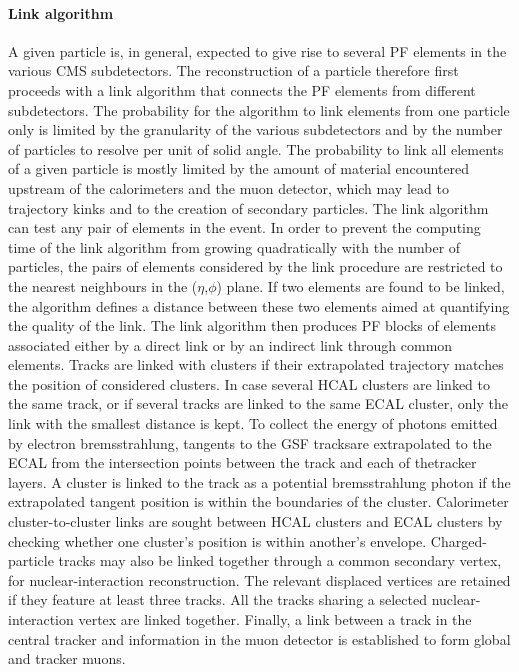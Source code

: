 \paragraph{Link algorithm}
A given particle is, in general, expected to give rise to several PF elements in the various CMS subdetectors. The reconstruction of a particle therefore first proceeds with a link algorithm that connects the PF elements from different subdetectors. The probability for the algorithm to link elements from one particle only is limited by the granularity of the various subdetectors and by the number of particles to resolve per unit of solid angle. The probability to link all elements of a given particle is mostly limited by the amount of material encountered upstream of the calorimeters and the muon detector, which may lead to trajectory kinks and to the creation of secondary particles. The link algorithm can test any pair of elements in the event. In order to prevent the computing time of the link algorithm from growing quadratically with the number of particles, the pairs of elements considered by the link procedure are restricted to the nearest neighbours in the ($\eta$,$\phi$) plane. If two elements are found to be linked, the algorithm defines a distance between these two elements aimed at quantifying the quality of the link. The link algorithm then produces PF blocks of elements associated either by a direct link or by an indirect link through common elements. Tracks are linked with clusters if their extrapolated trajectory matches the position of considered clusters. In case several HCAL clusters are linked to the same track, or if several tracks are linked to the same ECAL cluster, only the link with the smallest distance is kept. To collect the energy of photons emitted by electron bremsstrahlung, tangents to the GSF tracksare extrapolated to the ECAL from the intersection points between the track and each of thetracker  layers. A cluster is linked to the track as a potential bremsstrahlung photon if the extrapolated tangent position is within the boundaries of the cluster. Calorimeter cluster-to-cluster links are sought between HCAL clusters and ECAL clusters by checking whether one cluster's position is within another's envelope. Charged-particle tracks may also be linked together through a common secondary vertex, for nuclear-interaction reconstruction. The relevant displaced vertices are retained if they feature at least three tracks. All the tracks sharing a selected nuclear-interaction vertex are linked together. Finally, a link between a track in the central tracker and information in the muon detector is established to form global and tracker muons.

